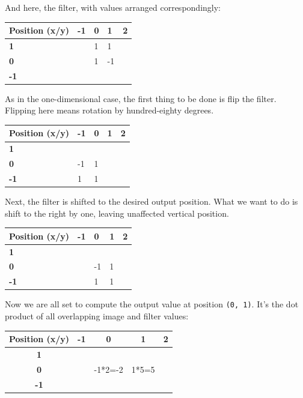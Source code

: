 \documentclass[
  letterpaper,
]{krantz}
\begin{document}
And here, the filter, with values arranged correspondingly:

\begin{longtable}[]{@{}lllll@{}}
\toprule\noalign{}
Position (x/y) & -1 & 0 & 1 & 2 \\
\midrule\noalign{}
\endhead
\bottomrule\noalign{}
\endlastfoot
\textbf{1} & & 1 & 1 & \\
\textbf{0} & & 1 & -1 & \\
\textbf{-1} & & & & \\
\end{longtable}

As in the one-dimensional case, the first thing to be done is flip the
filter. Flipping here means rotation by hundred-eighty degrees.

\begin{longtable}[]{@{}lllll@{}}
\toprule\noalign{}
Position (x/y) & -1 & 0 & 1 & 2 \\
\midrule\noalign{}
\endhead
\bottomrule\noalign{}
\endlastfoot
\textbf{1} & & & & \\
\textbf{0} & -1 & 1 & & \\
\textbf{-1} & 1 & 1 & & \\
\end{longtable}

Next, the filter is shifted to the desired output position. What we want
to do is shift to the right by one, leaving unaffected vertical
position.

\begin{longtable}[]{@{}lllll@{}}
\toprule\noalign{}
Position (x/y) & -1 & 0 & 1 & 2 \\
\midrule\noalign{}
\endhead
\bottomrule\noalign{}
\endlastfoot
\textbf{1} & & & & \\
\textbf{0} & & -1 & 1 & \\
\textbf{-1} & & 1 & 1 & \\
\end{longtable}

Now we are all set to compute the output value at position
\texttt{(0,\ 1)}. It's the dot product of all overlapping image and
filter values:

\begin{longtable}[]{@{}ccccc@{}}
\toprule\noalign{}
Position (x/y) & -1 & 0 & 1 & 2 \\
\midrule\noalign{}
\endhead
\bottomrule\noalign{}
\endlastfoot
\textbf{1} & & & & \\
\textbf{0} & & -1*2=-2 & 1*5=5 & \\
\textbf{-1} & & & & \\
\end{longtable}
\end{document}
